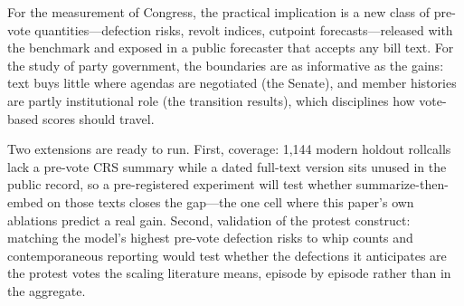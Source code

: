 \documentclass[12pt]{article}
\begin{document}
For the measurement of Congress, the practical implication is a new
class of pre-vote quantities---defection risks, revolt indices, cutpoint
forecasts---released with the benchmark and exposed in a public
forecaster that accepts any bill text. For the study of party
government, the boundaries are as informative as the gains: text buys
little where agendas are negotiated (the Senate), and member histories
are partly institutional role (the transition results), which
disciplines how vote-based scores should travel.

Two extensions are ready to run. First, coverage: 1,144 modern holdout
rollcalls lack a pre-vote CRS summary while a dated full-text version
sits unused in the public record, so a pre-registered experiment will
test whether summarize-then-embed on those texts closes the gap---the
one cell where this paper's own ablations predict a real gain. Second,
validation of the protest construct: matching the model's highest
pre-vote defection risks to whip counts and contemporaneous reporting
would test whether the defections it anticipates are the protest votes
the scaling literature means, episode by episode rather than in the
aggregate.



\end{document}
